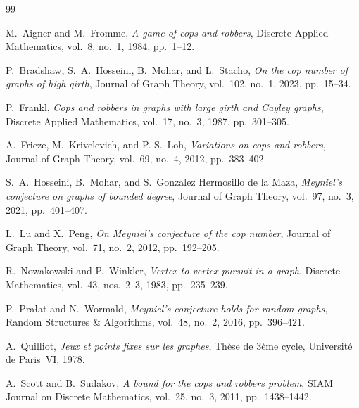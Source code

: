 \documentclass[11pt]{amsart}
\theoremstyle{definition}
\begin{document}
\begin{thebibliography}{99}

M.~Aigner and M.~Fromme,
\emph{A game of cops and robbers},
Discrete Applied Mathematics, vol.~8, no.~1, 1984, pp.~1--12.

P.~Bradshaw, S.~A.~Hosseini, B.~Mohar, and L.~Stacho,
\emph{On the cop number of graphs of high girth},
Journal of Graph Theory, vol.~102, no.~1, 2023, pp.~15--34.

P.~Frankl,
\emph{Cops and robbers in graphs with large girth and Cayley graphs},
Discrete Applied Mathematics, vol.~17, no.~3, 1987, pp.~301--305.

A.~Frieze, M.~Krivelevich, and P.-S.~Loh,
\emph{Variations on cops and robbers},
Journal of Graph Theory, vol.~69, no.~4, 2012, pp.~383--402.

S.~A.~Hosseini, B.~Mohar, and S.~Gonzalez Hermosillo de la Maza,
\emph{Meyniel's conjecture on graphs of bounded degree},
Journal of Graph Theory, vol.~97, no.~3, 2021, pp.~401--407.

L.~Lu and X.~Peng,
\emph{On Meyniel's conjecture of the cop number},
Journal of Graph Theory, vol.~71, no.~2, 2012, pp.~192--205.

R.~Nowakowski and P.~Winkler,
\emph{Vertex-to-vertex pursuit in a graph},
Discrete Mathematics, vol.~43, nos.~2--3, 1983, pp.~235--239.

P.~Pra\l at and N.~Wormald,
\emph{Meyniel's conjecture holds for random graphs},
Random Structures \& Algorithms, vol.~48, no.~2, 2016, pp.~396--421.

A.~Quilliot,
\emph{Jeux et points fixes sur les graphes},
Th\`ese de 3\`eme cycle, Universit\'e de Paris~VI, 1978.

A.~Scott and B.~Sudakov,
\emph{A bound for the cops and robbers problem},
SIAM Journal on Discrete Mathematics, vol.~25, no.~3, 2011, pp.~1438--1442.

\end{thebibliography}
\end{document}
